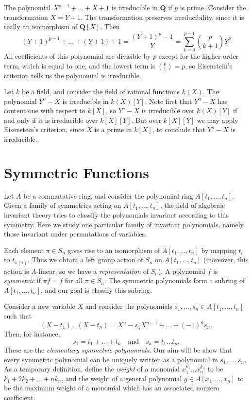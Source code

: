 \begin{example}
    The polynomial $X^{p-1} + \dots + X + 1$ is irreducible in $\mathbf{Q}$ if $p$ is prime. Consider the transformation $X = Y + 1$. The transformation preserves irreducibility, since it is really an isomorphism of $\mathbf{Q}[X]$. Then
    \[ (Y + 1)^{p-1} + \dots + (Y + 1) + 1 = \frac{(Y + 1)^p - 1}{Y} = \sum_{k = 0}^{p-1} \binom{p}{k+1} Y^k \]
    All coefficients of this polynomial are divisible by $p$ except for the higher order term, which is equal to one, and the lowest term is $\binom{p}{1} = p$, so Eisenstein's criterion tells us the polynomial is irreducible.
\end{example}

\begin{example}
    Let $k$ be a field, and consider the field of rational functions $k(X)$. The polynomial $Y^n - X$ is irreducible in $k(X)[Y]$. Note first that $Y^n - X$ has content one with respect to $k[X]$, so $Y^n - X$ is irreducible over $k(X)[Y]$ if and only if it is irreducible over $k[X][Y]$. But over $k[X][Y]$ we may apply Eisenstein's criterion, since $X$ is a prime in $k[X]$, to conclude that $Y^n - X$ is irreducible.
\end{example}


\section{Symmetric Functions}

Let $A$ be a commutative ring, and consider the polynomial ring $A[t_1,\dots,t_n]$. Given a family of symmetries acting on $A[t_1,\dots,t_n]$, the field of algebraic invariant theory tries to classify the polynomials invariant according to this symmetry. Here we study one particular family of invariant polynomials, namely those invariant under permutations of variables.

Each element $\pi \in S_n$ gives rise to an isomorphism of $A[t_1,\dots,t_n]$ by mapping $t_i$ to $t_{\pi(i)}$. Thus we obtain a left group action of $S_n$ on $A[t_1,\dots,t_n]$ (moreover, this action is $A$-linear, so we have a \emph{representation} of $S_n$). A polynomial $f$ is \emph{symmetric} if $\pi f = f$ for all $\pi \in S_n$. The symmetric polynomials form a subring of $A[t_1,\dots,t_n]$, and our goal is classify this subring.

Consider a new variable $X$ and consider the polynomials $s_1,\dots,s_n \in A[t_1,\dots,t_n]$ such that
%
\[ (X - t_1) \dots (X - t_n) = X^n - s_1 X^{n-1} + \dots + (-1)^n s_n. \]
%
Then, for instance,
%
\[ s_1 = t_1 + \dots + t_n \quad\text{and}\quad s_n = t_1 \dots t_n. \]
%
These are the \emph{elementary symmetric polynomials}. Our aim will be show that every symmetric polynomial can be uniquely written as a polynomial in $s_1,\dots,s_n$. As a temporary definition, define the \emph{weight} of a monomial $x_1^{k_1} \dots x_n^{k_n}$ to be $k_1 + 2k_2 + \dots + nk_n$, and the weight of a general polynomial $g \in A[x_1,\dots,x_n]$ to be the maximum weight of a monomial which has an associated nonzero coefficient.

